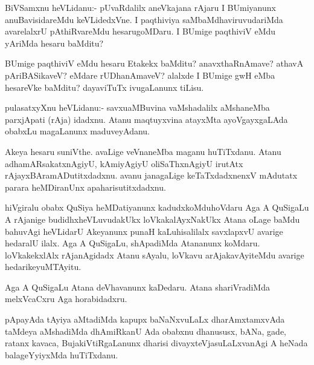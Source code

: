\documentclass{article}
\begin{document}
%
%


\begin{mn} %
BiVSamxnu heVLidanu:- pUvaRdalilx aneVkajana rAjaru I BUmiyanunx
anuBavisidareMdu keVLidedxVne. I paqthiviya saMbaMdhaviruvudariMda
avarelalxrU pAthiRvareMdu hesarugoMDaru. I BUmige paqthiviV eMdu
yAriMda hesaru baMditu?
\end{mn}

\begin{mn}
BUmige paqthiviV eMdu hesaru Etakekx baMditu? anavxthaRnAmave? athavA
pAriBASikaveV? eMdare rUDhanAmaveV? alalxde I BUmige gwH eMba
hesareVke baMditu? dayaviTuTx ivugaLanunx tiLisu.
\end{mn}

\begin{mn}%
pulasatxyXnu heVLidanu:- savxuaMBuvina vaMshadalilx aMshaneMba
parxjApati (rAja) idadxnu. Atanu maqtuyxvina atayxMta ayoVgayxgaLAda
obabxLu magaLanunx maduveyAdanu.
\end{mn}

\begin{mn}%
Akeya hesaru suniVthe. avaLige veVnaneMba maganu huTiTxdanu. Atanu
adhamARsakatxnAgiyU, kAmiyAgiyU oliSaThxnAgiyU irutAtx
rAjayxBAramADutitxdadxnu. avanu janagaLige keTaTxdadxnenxV mAdutatx
parara heMDiranUnx apaharisutitxdadxnu.
\end{mn}

\begin{mn}%
hiVgiralu obabx QuSiya heMDatiyanunx kadudxkoMduhoVdaru Aga A QuSigaLu
A rAjanige budidhxheVLuvudakUkx loVkakalAyxNakUkx Atana oLage baMdu
bahuvAgi heVLidarU Akeyanunx punaH kaLuhisalilalx savxlapxvU avarige
hedaralU ilalx. Aga A QuSigaLu, shApadiMda Atananunx
koMdaru. loVkakekxlAlx rAjanAgidadx Atanu sAyalu, loVkavu
arAjakavAyiteMdu avarige hedarikeyuMTAyitu.
\end{mn}

\begin{mn}
Aga A QuSigaLu Atana deVhavanunx kaDedaru. Atana shariVradiMda
melxVcaCxru Aga horabidadxru.
\end{mn}

\begin{mn}
pApayAda tAyiya aMtadiMda kapupx baNaNxvuLaLx dharAmxtamxvAda taMdeya
aMshadiMda dhAmiRkanU Ada obabxnu dhanususx, bANa, gade, ratanx
kavaca, BujakiVtiRgaLanunx dharisi divayxteVjasuLaLxvanAgi A heNada
balageYyiyxMda huTiTxdanu.
\end{mn}
\end{document}
